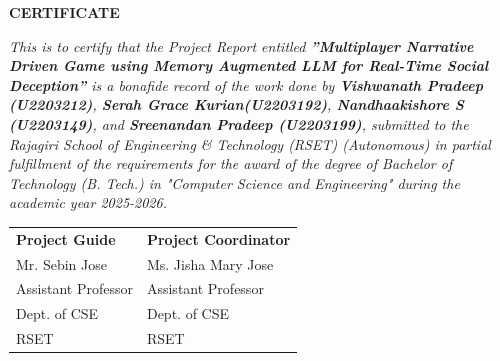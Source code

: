 	\newpage
	\thispagestyle{empty}
	\vspace{1cm}
	\begin{center}
	
		\large \bfseries{\huge{CERTIFICATE}}\\[1cm]
	\end{center}
	
	\renewcommand{\baselinestretch}{1.2}\normalsize
	
	\emph{This is to certify that the Project Report entitled \textbf{”Multiplayer Narrative Driven Game using Memory
Augmented LLM for Real-Time Social Deception”} is a bonafide record of the work done by 
\textbf{Vishwanath Pradeep (U2203212)}, 
\textbf{Serah Grace Kurian(U2203192)},
\textbf{Nandhaakishore S (U2203149)},
and 
\textbf{Sreenandan Pradeep (U2203199)},
submitted to the Rajagiri School of Engineering \& Technology (RSET) (Autonomous) in partial fulfillment of the requirements for the award of the degree of Bachelor of Technology (B. Tech.) in "Computer Science and Engineering" during the academic year 2025-2026.}\\[2.5cm]
	
\begin{flushleft}
	
	
	\begin{longtable}{p{10.8cm} p{10.8cm}}
        {\textbf{Project Guide}} &  {\textbf{Project Coordinator}}\\
		{Mr. Sebin Jose} & {Ms. Jisha Mary Jose}\\
		{Assistant Professor} & {Assistant Professor}\\
		{Dept. of CSE} & {Dept. of CSE}\\
		{RSET} & {RSET} \\
		
	\end{longtable}
\end{flushleft}
	
